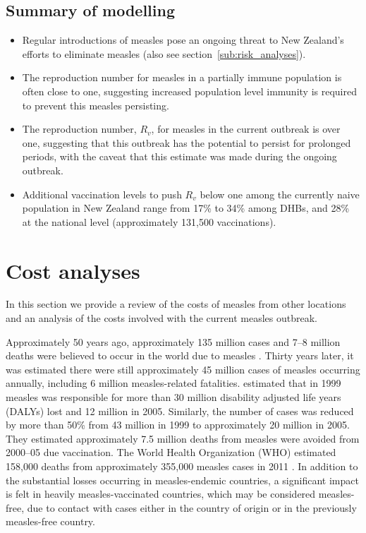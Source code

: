 \documentclass{article}
\begin{document}
\subsection{Summary of modelling}
\begin{itemize}
\item Regular introductions of measles pose an ongoing threat to New Zealand's efforts to eliminate measles (also see section~\ref{sub:risk_analyses}).
\item The reproduction number for measles in a partially immune population is often close to one, suggesting increased population level immunity is required to prevent this measles persisting.
 \item The reproduction number, $R_v$, for measles in the current outbreak is over one, suggesting that this outbreak has the potential to persist for prolonged periods, with the caveat that this estimate was made during the ongoing outbreak.
 \item Additional vaccination levels to push $R_v$ below one among the currently naive population in New Zealand range from 17\% to 34\% among DHBs, and 28\% at the national level (approximately 131,500 vaccinations).
\end{itemize}

\section{Cost analyses}

In this section we provide a review of the costs of measles from other locations and an analysis of the costs involved with the current measles outbreak.

Approximately 50 years ago, approximately 135 million cases and 7--8 million deaths were believed to occur in the world due to measles \citep{clements4}. Thirty years later, it was estimated there were still approximately 45 million cases of measles occurring annually, including 6 million measles-related fatalities. \citep{wolfson7} estimated that in 1999 measles was responsible for more than 30 million disability adjusted life years (DALYs) lost and 12 million in 2005. Similarly, the number of cases was reduced by more than 50\% from 43 million in 1999 to approximately 20 million in 2005. They estimated approximately 7.5 million deaths from measles were avoided from 2000--05 due vaccination. The World Health Organization (WHO) estimated 158,000 deaths from approximately 355,000 measles cases in 2011 \citep{who13}.  In addition to the substantial losses occurring in measles-endemic countries, a significant impact is felt in heavily measles-vaccinated countries, which may be considered measles-free, due to contact with cases either in the country of origin or in the previously measles-free country.
\end{document}
